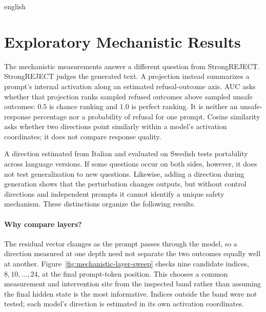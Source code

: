 \begin{otherlanguage*}{english}
\section{Exploratory Mechanistic Results}
\label{sec:mechanistic-results}
\setcounter{secnumdepth}{3}

The mechanistic measurements answer a different question from StrongREJECT. StrongREJECT judges the generated text. A projection instead summarizes a prompt's internal activation along an estimated refusal-outcome axis. AUC asks whether that projection ranks sampled refused outcomes above sampled unsafe outcomes: $0.5$ is chance ranking and $1.0$ is perfect ranking. It is neither an unsafe-response percentage nor a probability of refusal for one prompt. Cosine similarity asks whether two directions point similarly within a model's activation coordinates; it does not compare response quality.

A direction estimated from Italian and evaluated on Swedish tests portability across language versions. If some questions occur on both sides, however, it does not test generalization to new questions. Likewise, adding a direction during generation shows that the perturbation changes outputs, but without control directions and independent prompts it cannot identify a unique safety mechanism. These distinctions organize the following results.

\paragraph*{Why compare layers?} The residual vector changes as the prompt passes through the model, so a direction measured at one depth need not separate the two outcomes equally well at another. Figure~\ref{fig:mechanistic-layer-sweep} checks nine candidate indices, $8,10,\ldots,24$, at the final prompt-token position. This chooses a common measurement and intervention site from the inspected band rather than assuming the final hidden state is the most informative. Indices outside the band were not tested; each model's direction is estimated in its own activation coordinates.


\end{otherlanguage*}
